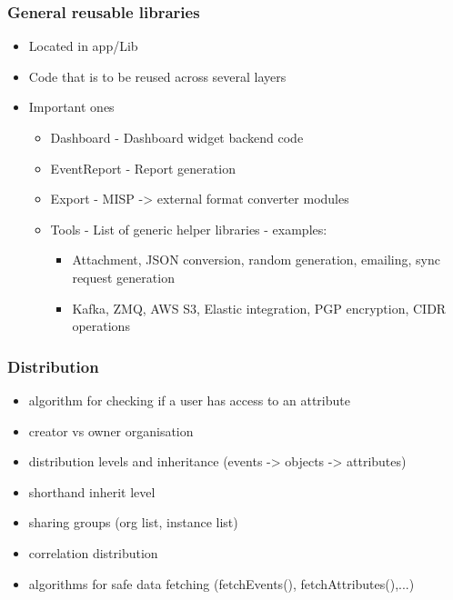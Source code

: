 \begin{frame}
  \frametitle{General reusable libraries}
  \begin{itemize}
    \item Located in app/Lib
    \item Code that is to be reused across several layers
    \item Important ones
    \begin{itemize}
      \item Dashboard - Dashboard widget backend code
      \item EventReport - Report generation
      \item Export - MISP -> external format converter modules
      \item Tools - List of generic helper libraries - examples:
      \begin{itemize}
         \item Attachment, JSON conversion, random generation, emailing, sync request generation
         \item Kafka, ZMQ, AWS S3, Elastic integration, PGP encryption, CIDR operations
      \end{itemize}
    \end{itemize}
  \end{itemize}
\end{frame}

\begin{frame}
  \frametitle{Distribution}
  \begin{itemize}
    \item algorithm for checking if a user has access to an attribute
    \item creator vs owner organisation
    \item distribution levels and inheritance (events -> objects -> attributes)
    \item shorthand inherit level
    \item sharing groups (org list, instance list)
    \item correlation distribution
    \item algorithms for safe data fetching (fetchEvents(), fetchAttributes(),...)
  \end{itemize}
\end{frame}

